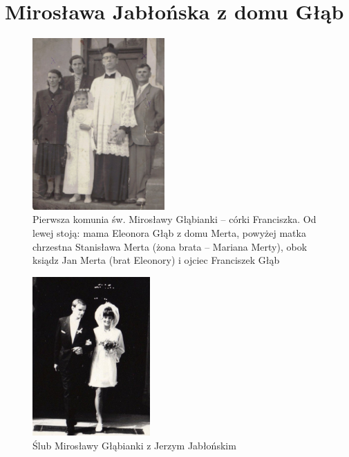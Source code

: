 \section{Mirosława Jabłońska z domu Głąb}
   
\begin{figure}[!h]
\begin{center}
\includegraphics[width=0.45\textwidth]{zdjecia/pierwsza_komunia_miroslawy_glab.jpg}
\caption[Pierwsza komunia św. Mirosławy Głąbianki]{Pierwsza komunia św. Mirosławy Głąbianki -- córki Franciszka. Od lewej stoją: mama Eleonora Głąb z domu Merta, powyżej matka chrzestna Stanisława Merta (żona brata -- Mariana Merty), obok ksiądz Jan Merta (brat Eleonory) i ojciec Franciszek Głąb}
\label{rys:pierwsza_komunia_miroslawy_glab}
\end{center}
\end{figure}

\begin{figure}[!hb]
\begin{center}
\includegraphics[width=0.4\textwidth]{zdjecia/slub_jerzego_i_miroslawy_jablonskich.jpg}
\caption{Ślub Mirosławy Głąbianki z Jerzym Jabłońskim}
\label{rys:slub_jerzego_i_miroslawy_jablonskich}
\end{center}
\end{figure}


